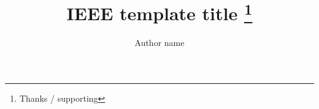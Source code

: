 \documentclass[10pt, conference, letterpaper]{IEEEtran}
\begin{document}
    
    \title{IEEE template title \thanks{Thanks / supporting}}
    \author{ Author name}
    \maketitle
    
    

    
\end{document}
